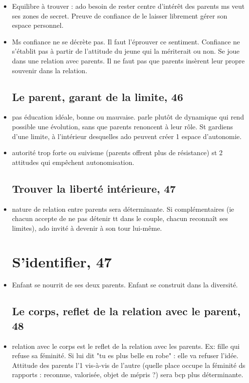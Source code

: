 \documentclass[12pt]{report}
\begin{document}
\begin{itemize}
\item Equilibre à trouver : ado besoin de rester centre d'intérêt des parents ms veut ses zones de secret. Preuve de confiance de le laisser librement gérer son espace personnel. \\
\item Ms confiance ne se décrète pas. Il faut l'éprouver ce sentiment. Confiance ne s'établit pas à partir de l'attitude du jeune qui la mériterait ou non. Se joue dans une relation avec parents. Il ne faut pas que parents insèrent leur propre souvenir dans la relation. 

\subsection{Le parent, garant de la limite, 46}

\item pas éducation idéale, bonne ou mauvaise. parle plutôt de dynamique qui rend possible une évolution, sans que parents renoncent à leur rôle. St gardiens d'une limite, à l'intérieur desquelles ado peuvent créer 1 espace d'autonomie.\\
\item autorité trop forte ou suivisme (parents offrent plus de résistance) st 2 attitudes qui empêchent autonomisation.

\subsection{Trouver la liberté intérieure, 47}


\item nature de relation entre parents sera déterminante. Si complémentaires (ie chacun accepte de ne pas détenir tt dans le couple, chacun reconnaît ses limites), ado invité à devenir à son tour lui-même.

\section{S'identifier, 47}

\item Enfant se nourrit de ses deux parents. Enfant se construit dans la diversité. 

\subsection{Le corps, reflet de la relation avec le parent, 48}

\item relation avec le corps est le reflet de la relation avec les parents. Ex: fille qui refuse sa féminité. Si lui dit "tu es plus belle en robe" : elle va refuser l'idée.  Attitude des parents l'1 vis-à-vis de l'autre (quelle place occupe la féminité ds rapports : reconnue, valorisée, objet de mépris ?) sera bcp plus déterminante.


\end{itemize}
\end{document}
